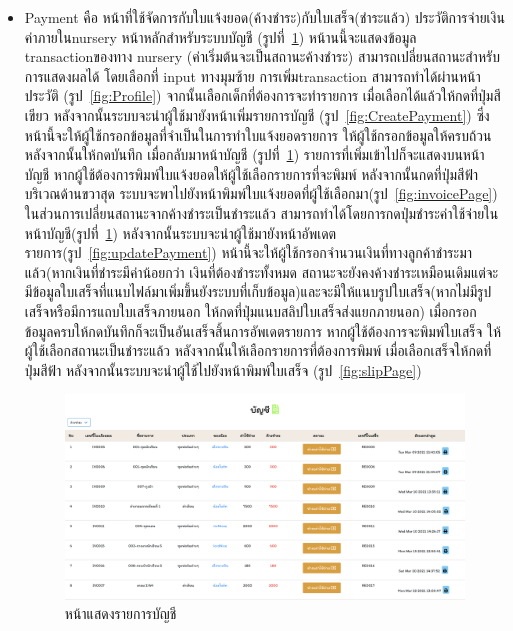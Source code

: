 \begin{itemize}
  \item  Payment คือ หน้าที่ใช้จัดการกับใบแจ้งยอด(ค้างชำระ)กับใบเสร็จ(ชำระแล้ว) ประวัติการจ่ายเงินค่าภายในnursery หน้าหลักสำหรับระบบบัญชี (รูปที่~\ref{fig:Payment}) หน้านนี้จะแสดงข้อมูล transactionของทาง nursery (ค่าเริ่มต้นจะเป็นสถานะค้างชำระ) สามารถเปลี่ยนสถานะสำหรับการแสดงผลได้ โดยเลือกที่ input ทางมุมซ้าย 
  การเพิ่มtransaction สามารถทำได้ผ่านหน้าประวัติ (รูป~\ref{fig:Profile}) จากนั้นเลือกเด็กที่ต้องการจะทำรายการ เมื่อเลือกได้แล้วให้กดที่ปุ่มสีเขียว
  หลังจากนั้นระบบจะนำผู้ใช้มายังหน้าเพิ่มรายการบัญชี (รูป~\ref{fig:CreatePayment}) ซึ่งหน้านี้จะให้ผู้ใช้กรอกข้อมูลที่จำเป็นในการทำใบแจ้งยอดรายการ ให้ผู้ใช้กรอกข้อมูลให้ครบถ้วน หลังจากนั้นให้กดบันทึก
  เมื่อกลับมาหน้าบัญชี (รูปที่~\ref{fig:Payment}) รายการที่เพิ่มเข้าไปก็จะแสดงบนหน้าบัญชี หากผู้ใช้ต้องการพิมพ์ใบแจ้งยอดให้ผู้ใช้เลือกรายการที่จะพิมพ์ หลังจากนั้นกดที่ปุ่มสีฟ้าบริเวณด้านขวาสุด
  ระบบจะพาไปยังหน้าพิมพ์ใบแจ้งยอดที่ผู้ใช้เลือกมา(รูป~\ref{fig:invoicePage}) 
  ในส่วนการเปลี่ยนสถานะจากค้างชำระเป็นชำระแล้ว สามารถทำได้โดยการกดปุ่มชำระค่าใช้จ่ายในหน้าบัญชี(รูปที่~\ref{fig:Payment}) หลังจากนั้นระบบจะนำผู้ใช้มายังหน้าอัพเดตรายการ(รูป~\ref{fig:updatePayment})
  หน้านี้จะให้ผู้ใช้กรอกจำนวนเงินที่ทางลูกค้าชำระมาแล้ว(หากเงินที่ชำระมีค่าน้อยกว่า เงินที่ต้องชำระทั้งหมด สถานะจะยังคงค้างชำระเหมือนเดิมแต่จะมีข้อมูลใบเสร็จที่แนบไฟล์มาเพิ่มขึ้นยังระบบที่เก็บข้อมูล)และจะมีให้แนบรูปใบเสร็จ(หากไม่มีรูปเสร็จหรือมีการแถบใบเสร็จภายนอก ให้กดที่ปุ่มแนบสลิปใบเสร็จส่งแยกภายนอก)
  เมื่อกรอกข้อมูลครบให้กดบันทึกก็จะเป็นอันเสร็จสิ้นการอัพเดตรายการ หากผู้ใช้ต้องการจะพิมพ์ใบเสร็จ
  ให้ผู้ใช้เลือกสถานะเป็นชำระแล้ว หลังจากนั้นให้เลือกรายการที่ต้องการพิมพ์ เมื่อเลือกเสร็จให้กดที่ปุ่มสีฟ้า
  หลังจากนั้นระบบจะนำผู้ใช้ไปยังหน้าพิมพ์ใบเสร็จ (รูป~\ref{fig:slipPage}) 

  \begin{figure}
    \begin{center}
    \includegraphics[width=\linewidth]{images/Payment.png}
    \end{center}
    \caption[หน้าแสดงรายการบัญชี]{หน้าแสดงรายการบัญชี}
    \label{fig:Payment}
  

\end{figure}
\end{itemize}
